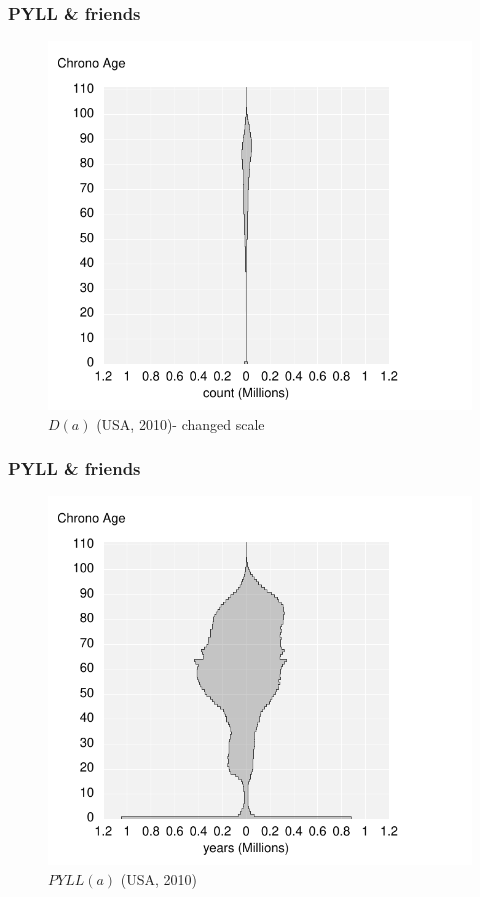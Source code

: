 \documentclass{beamer}
\begin{document}
\begin{frame}
\frametitle{PYLL \& friends}
\vspace{-1cm}
\begin{figure}[b]
    \centering
    \includegraphics[scale=.7]{Figures/f4_Da.pdf}
    \caption{$D(a)$ (USA, 2010)- changed scale}
\end{figure} 
\end{frame}
\begin{frame}
\frametitle{PYLL \& friends}
\vspace{-1cm}
\begin{figure}[b]
    \centering
    \includegraphics[scale=.7]{Figures/f5_Daea.pdf}
    \caption{$PYLL(a)$ (USA, 2010)}
\end{figure} 
\end{frame}
\end{document}
